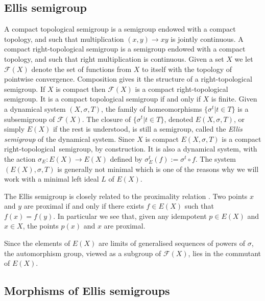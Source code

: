 \documentclass[10pt,a4paper]{amsart}
\numberwithin{equation}{section}
\newcommand{\Ff}{{\mathcal F}}
\newcommand{\rst}{right-topological}
\begin{document}
\subsection{Ellis semigroup} 
A compact  topological semigroup is a semigroup endowed with a compact topology, and 
such that  multiplication  $(x,y)\rightarrow xy$ is jointly continuous.
A compact right-topological semigroup is a semigroup endowed with a compact topology, and such that right multiplication  is continuous.  
Given a set $X$ we let $\Ff(X)$ denote the set of functions from $X$ to itself with the topology of pointwise convergence. Composition gives it the structure of a right-topological semigroup. If $X$ is compact then $\Ff(X)$ is a compact right-topological semigroup. It is  a compact topological semigroup if and only if $X$ is finite. 
Given a dynamical system $(X,\sigma, T)$, the family of homeomorphisms
$\{\sigma^t | t\in T\}$ is a subsemigroup of $\mathcal F(X)$. 
The closure of $\{\sigma^t | t\in T\}$, denoted $E(X, \sigma, T)$,  or simply $E(X)$ if the rest is understood, is still a semigroup, called the   {\em Ellis semigroup}  of the dynamical system. 
Since $X$ is compact 
$E(X, \sigma,T)$ is 
a compact \rst\ semigroup, by construction.  It is also a dynamical system, with the action $\sigma_E:E(X) \rightarrow E(X)$ defined by  $\sigma_E^t(f):= \sigma^{t}\circ f$. The system $(E(X), \sigma,T)$ is generally not minimal which is one of the reasons why we will work with a minimal left ideal $L$ of $E(X)$.






The Ellis semigroup is closely related to the proximality relation \cite[Chapter 3, Proposition 8]{Auslander1988}. 
Two points $x$ and $y$ are proximal if and only if there exists $f\in E(X)$ such that $f(x)=f(y)$. 
In particular we see that, given any idempotent $p\in E(X)$ and $x\in X$, the points $p(x)$ and $x$ are proximal.


Since the elements of $E(X)$ are limits of generalised sequences of powers of $\sigma$, the automorphism group, viewed as a subgroup of $\Ff(X)$, lies in the commutant of $E(X)$. 
 
\subsection{Morphisms of Ellis semigroups}
\end{document}

